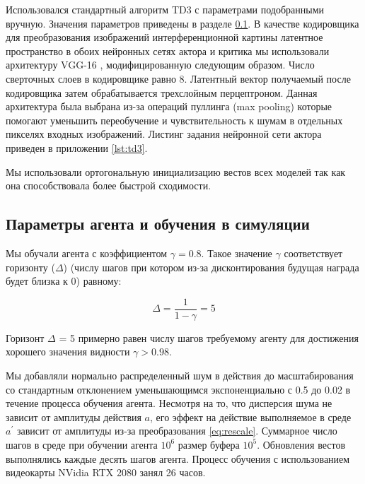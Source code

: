 Использовался стандартный алгоритм TD3 с параметрами подобранными вручную. Значения параметров приведены в разделе \ref{sec:ch2/sec4/subsec4}. В качестве кодировщика для преобразования изображений интерференционной картины латентное пространство в обоих нейронных сетях актора и критика мы использовали архитектуру VGG-16 \cite{simonyan2014very}, модифицированную следующим образом. Число сверточных слоев в кодировщике равно 8. Латентный вектор получаемый после кодировщика затем обрабатывается трехслойным перцептроном. Данная архитектура была выбрана из-за операций пуллинга (max pooling) которые помогают уменьшить переобучение и чувствительность к шумам в отдельных пикселях входных изображений. Листинг задания нейронной сети актора приведен в приложении \ref{lst:td3}. 

Мы использовали ортогональную инициализацию вестов всех моделей так как она способствовала более быстрой сходимости.



\subsection{Параметры агента и обучения в симуляции}\label{sec:ch2/sec4/subsec4}

Мы обучали агента с коэффициентом $\gamma = 0.8$. Такое значение $\gamma$ соответствует горизонту ($\Delta$) (числу шагов при котором из-за дисконтирования будущая награда будет близка к $0$) равному: 

\begin{equation}
    \Delta = \frac{1}{1 - \gamma} = 5
\end{equation}

Горизонт $\Delta$ = 5 примерно равен числу шагов требуемому агенту для достижения хорошего значения видности $\gamma > 0.98$.  

Мы добавляли нормально распределенный шум в действия до масштабирования со стандартным отклонением уменьшающимся экспоненциально с 0.5 до 0.02 в течение процесса обучения агента. Несмотря на то, что дисперсия шума не зависит от амплитуды действия $a$, его эффект на действие выполняемое в среде $a^{\prime}$ зависит от амплитуды из-за преобразования \eqref{eq:rescale}. Суммарное число шагов в среде при обучении агента $10^6$ размер буфера $10^5$. Обновления вестов выполнялись каждые десять шагов агента. Процесс обучения с использованием видеокарты NVidia RTX 2080 занял 26 часов. 

